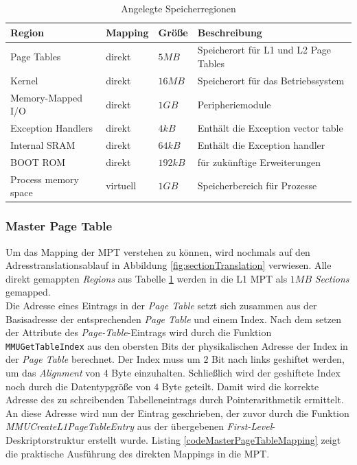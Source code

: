 \begin{table}[H]
\begin{tabular}{p{4cm} | p{1.5cm} | p{1.5cm} | p{6cm}}
  \textbf{Region} & \textbf{Mapping} & \textbf{Größe} & \textbf{Beschreibung} \\ \hline
  Page Tables & direkt & $5MB$ & Speicherort für L1 und L2 Page Tables\\
  Kernel & direkt & $16MB$ & Speicherort für das Betriebssystem\\
  Memory-Mapped I/O & direkt &  $1GB$ & Peripheriemodule\\
  Exception Handlers & direkt &  $4kB$ & Enthält die Exception vector table\\
  Internal SRAM & direkt & $64kB$ & Enthält die Exception handler\\
  BOOT ROM & direkt & $192kB$ & für zukünftige Erweiterungen \\ 
  Process memory space & virtuell & $1GB$ & Speicherbereich für Prozesse
 \end{tabular}
 \caption{Angelegte Speicherregionen}
 \label{table:MemoryRegions}
\end{table}


\subsubsection{Master Page Table}

Um das Mapping der \ac{MPT} verstehen zu können, wird nochmals auf den Adresstranslationsablauf in Abbildung \ref{fig:sectionTranslation} verwiesen. Alle direkt gemappten \textit{Regions} aus Tabelle \ref{table:MemoryRegions} werden in die L1 \ac{MPT} als $1MB$ \textit{Sections} gemapped.\\

Die Adresse eines Eintrags in der \textit{Page Table} setzt sich zusammen aus der Basisadresse der entsprechenden \textit{Page Table} und einem Index. Nach dem setzen der Attribute des \textit{Page-Table}-Eintrags wird durch die Funktion \texttt{MMUGetTableIndex} aus den obersten Bits der physikalischen Adresse der Index in der \textit{Page Table} berechnet. Der Index muss um $2$ Bit nach links geshiftet werden, um das \textit{Alignment} von $4$ Byte einzuhalten. Schließlich wird der geshiftete Index noch durch die Datentypgröße von $4$ Byte geteilt. Damit wird die korrekte Adresse des zu schreibenden Tabelleneintrags durch Pointerarithmetik ermittelt. An diese Adresse wird nun der Eintrag geschrieben, der zuvor durch die Funktion \emph{MMUCreateL1PageTableEntry} aus der übergebenen \textit{First-Level}-Deskriptorstruktur erstellt wurde. Listing \ref{codeMasterPageTableMapping} zeigt die praktische Ausführung des direkten Mappings in die \ac{MPT}.\\ 


